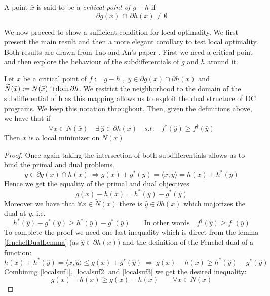 \begin{definition}
	A point $\bar x$ is said to be a \emph{critical point of $g-h$} if
	\[\partial g(\bar x) \, \cap \, \partial h(\bar x) \neq \emptyset \]
\end{definition}
We now proceed to show a sufficient condition for local optimality.
We first present the main result and then a more elegant corollary
to test local optimality. Both results are drawn from  Tao and An's paper
\autocite{tao1997convex}.
First we need a critical point and then explore the behaviour of 
the subdifferentials of $g$ and $h$ around it.
\begin{theorem}
Let $\bar x$ be a critical point of $f:=g-h$ , 
$\, \bar y \in \partial g(\bar x) \cap \partial h(\bar x)$ and 
$\widetilde{N}(\bar x):= N(\bar x) \cap \mathrm{dom} \,
\partial h$. We restrict the neighborhood to the domain of the subdifferential
of h as this mapping allows us to exploit the dual structure of DC programs.
We keep this notation throughout.
Then, given the definitions above, we have that if 
\begin{equation}
	\forall x \in \widetilde{N}(\bar x) \quad \exists \
	\hat y \in \partial h(x)  \quad s.t.\quad
	f^\dagger(\hat y)\geq f^\dagger(\bar y)
\end{equation}
Then  $\bar x$ is a local minimizer on $N(\bar x)$
\begin{proof}
Once again taking the intersection of both subdifferentials
allows us to bind the primal and dual problems. 
\begin{equation*}
	\bar y \in \partial g(\bar x) \cap h(\bar x) \ \Rightarrow 
	g(\bar x)+g^*(\bar y)=\langle \bar x,\bar y\rangle = 
	h(\bar x) + h^*(\bar y)
\end{equation*}
Hence  we get the equality of the primal and dual objectives
\begin{equation}
	g(\bar x) - h(\bar x) = h^*(\bar y) - g^*(\bar y)
	\label{localsuf1}
\end{equation}
Moreover we have that $\forall x \in \widetilde{N}(\bar x)$ there is 
$\hat y\in \partial h(x)$ which majorizes the dual at $\bar y$, i.e.
\begin{equation}
	h^*(\hat y) - g^*(\hat y) \geq h^*(\bar y) - g^*(\bar y) \qquad
	\text{In other words} \quad f^\dagger (\hat y) \geq f^\dagger(\bar y)
	\label{localsuf2}
\end{equation}
To complete the proof we need one last inequality which is direct
from the lemma \ref{fenchelDualLemma} (as $\hat y \in \partial h(x)$)
and the definition of the Fenchel dual of a function:
\begin{equation}
	h(x)+h^*(\hat y) = \langle x,\hat y\rangle \leq g(x)+g^*(\hat y)
	\ \Rightarrow \ g(x)-h(x)\geq h^*(\hat y) -g^*(\hat y)
	\label{localsuf3}
\end{equation}
Combining \eqref{localsuf1}, \eqref{localsuf2} and \eqref{localsuf3}
we get the desired inequality:
\begin{equation*}
	g(x) - h(x) \geq g(\bar x)-h(\bar x) \qquad \forall x \in 
	N(\bar x) 
\end{equation*}
\end{proof}
\end{theorem}

